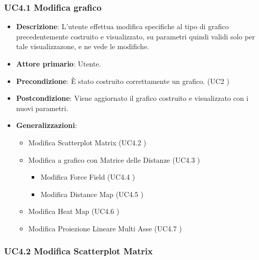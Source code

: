 \newpage
\subsubsection{UC4.1 Modifica grafico}
\label{ssub:uc4.1}

\begin{itemize}
    \item \textbf{Descrizione}: L’utente effettua modifica specifiche al tipo di grafico precedentemente costruito e visualizzato, 
                                su parametri quindi validi solo per tale visualizzazone, e ne vede le modifiche.
	
    \item \textbf{Attore primario}: Utente.
    
    \item \textbf{Precondizione}:   È stato costruito correttamente un grafico. (UC2 )

    \item \textbf{Postcondizione}:  Viene aggiornato il grafico costruito e visualizzato con i nuovi parametri.

    \item \textbf{Generalizzazioni}:
        \begin{itemize}
            \item Modifica Scatterplot Matrix (UC4.2 )
            \item Modifica a grafico con Matrice delle Distanze (UC4.3 )
            \begin{itemize}
                \item Modifica Force Field (UC4.4 )
                \item Modifica Distance Map (UC4.5 )
             \end{itemize}
            \item Modifica Heat Map (UC4.6 )
            \item Modifica Proiezione Lineare Multi Asse (UC4.7 )
        \end{itemize}
\end{itemize}

\subsubsection{UC4.2 Modifica Scatterplot Matrix}
\label{ssub:uc4.2}

